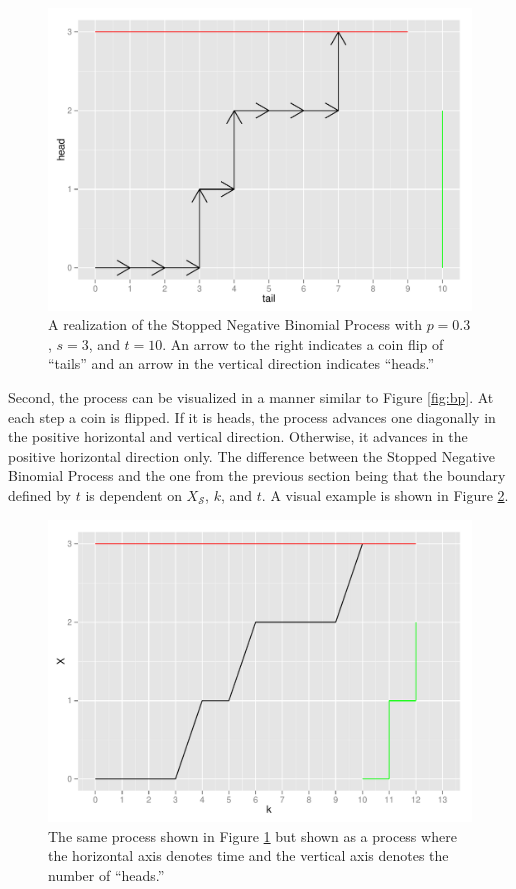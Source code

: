 \documentclass{article}
\newcommand{\Xs}{X_\mathcal{S}}
\begin{document}
\begin{figure}[ht]
\includegraphics[width=\textwidth]{ZeltermanPlot.pdf}
\caption{
A realization of the Stopped Negative Binomial Process with $p=0.3$, $s=3$, 
and $t=10$. An arrow to the right indicates a coin flip of ``tails'' and
an arrow in the vertical direction indicates ``heads.''
}
\label{fig:zelterman_viz}
\end{figure}

Second, the process can be visualized in a manner similar to 
Figure \ref{fig:bp}. At each
step a coin is flipped. If it is heads, the process advances one diagonally
in the positive horizontal and vertical direction. Otherwise, it advances
in the positive horizontal direction only. The difference between the Stopped
Negative Binomial Process and the one from the previous section being that
the boundary defined by $t$ is dependent on $\Xs$, $k$, and $t$. A visual
example is shown in Figure \ref{fig:kane_viz}.

\begin{figure}[ht]
\includegraphics[width=\textwidth]{KanePlot.pdf}
\caption{
The same process shown in Figure \ref{fig:zelterman_viz} but shown as
a process where the horizontal axis denotes time and the vertical axis
denotes the number of ``heads.'' 
}
\label{fig:kane_viz}
\end{figure}
\end{document}
